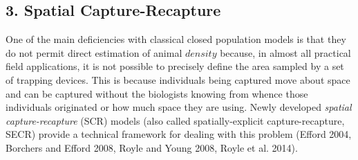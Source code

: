 \documentclass{book}
\begin{document}
\subsection*{3. Spatial Capture-Recapture}

One of the main deficiencies with classical closed population models
is that they do not permit direct estimation of animal $density$
because, in almost all practical field applications, it is not
possible to precisely define the area sampled by a set of trapping
devices. This is because individuals being captured move about space
and can be captured without the biologists knowing from whence those
individuals originated or how much space they are using. Newly
developed {\it spatial capture-recapture} (SCR) models (also called
spatially-explicit capture-recapture, SECR) provide a technical
framework for dealing with this problem (Efford 2004, Borchers and
Efford 2008, Royle and Young 2008, Royle et al. 2014).
\end{document}
